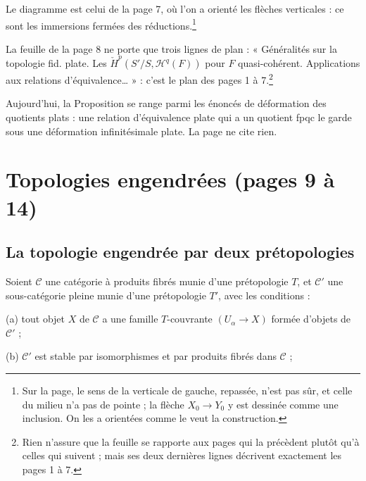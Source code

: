 \documentclass[11pt,a4paper]{article}
\begin{document}

Le diagramme est celui de la page 7, où l'on a orienté les flèches
verticales : ce sont les immersions fermées des réductions.\footnote{Sur la
page, le sens de la verticale de gauche, repassée, n'est pas sûr, et celle du
milieu n'a pas de pointe ; la flèche $X_0 \to Y_0$ y est dessinée comme une
inclusion. On les a orientées comme le veut la construction.}

La feuille de la page 8 ne porte que trois lignes de plan : « Généralités sur
la topologie fid. plate. Les $\check{H}^p(S'/S, \mathcal{H}^q(F))$ pour
$F$ quasi-cohérent. Applications aux relations d'équivalence… » : c'est le
plan des pages 1 à 7.\footnote{Rien n'assure que la feuille se rapporte aux
pages qui la précèdent plutôt qu'à celles qui suivent ; mais ses deux
dernières lignes décrivent exactement les pages 1 à 7.}

Aujourd'hui, la Proposition se range parmi les énoncés de déformation des
quotients plats : une relation d'équivalence plate qui a un quotient fpqc le
garde sous une déformation infinitésimale plate. La page ne cite rien.

\section*{Topologies engendrées (pages 9 à 14)}

\subsection*{La topologie engendrée par deux prétopologies}

Soient $\mathcal{C}$ une catégorie à produits fibrés munie d'une
prétopologie $T$, et $\mathcal{C}'$ une sous-catégorie pleine munie d'une
prétopologie $T'$, avec les conditions :

(a) tout objet $X$ de $\mathcal{C}$ a une famille $T$-couvrante $(U_\alpha \to
X)$ formée d'objets de $\mathcal{C}'$ ;

(b) $\mathcal{C}'$ est stable par isomorphismes et par produits fibrés dans
$\mathcal{C}$ ;
\end{document}
